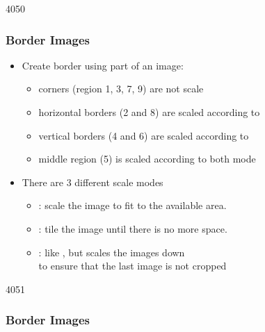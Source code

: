 \begin{slide}{4050}\frametitle{Border Images}


\begin{itemize}
\item Create border using part of an image:
  \begin{itemize}
  \item corners (region 1, 3, 7, 9) are not scale
  \item horizontal borders (2 and 8) are scaled according to 
  \item vertical borders (4 and 6) are scaled according to 
  \item middle region (5) is scaled according to both mode
  \end{itemize}
\item There are 3 different scale modes
  \begin{itemize}
  \item {}: scale the image to fit to the available area.
  \item {}: tile the image until there is no more space.
  \item {}: like , but scales the images down\\
    to ensure that the last image is not cropped
  \end{itemize}
\end{itemize}

\end{slide}


\begin{slide}{4051}\frametitle{Border Images}


\begin{qml}
\\
\\
\\
\\
\\
\\
\qtt{\}}
\end{qml}


\end{slide}
